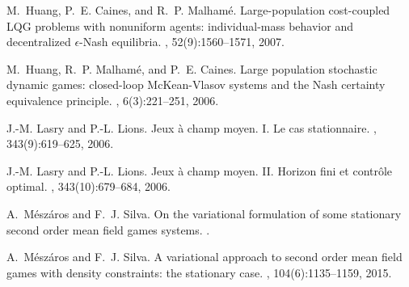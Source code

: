 \documentclass[12pt]{amsart}
\newcommand{\1}{{\chi}}
\theoremstyle{definition}
\begin{document}
\begin{thebibliography}{10}
	M.~Huang, P.~E. Caines, and R.~P. Malham{\'e}.
	\newblock Large-population cost-coupled {LQG} problems with nonuniform agents:
	individual-mass behavior and decentralized {$\epsilon$}-{N}ash equilibria.
	, 52(9):1560--1571, 2007.
	
	M.~Huang, R.~P. Malham{\'e}, and P.~E. Caines.
	\newblock Large population stochastic dynamic games: closed-loop
	{M}c{K}ean-{V}lasov systems and the {N}ash certainty equivalence principle.
	, 6(3):221--251, 2006.
	
	J.-M. Lasry and P.-L. Lions.
	\newblock Jeux \`a champ moyen. {I}. {L}e cas stationnaire.
	, 343(9):619--625, 2006.
	
	J.-M. Lasry and P.-L. Lions.
	\newblock Jeux \`a champ moyen. {II}. {H}orizon fini et contr\^ole optimal.
	, 343(10):679--684, 2006.
	
	A.~M\'esz\'aros and F.~J. Silva.
	\newblock On the variational formulation of some stationary second order mean
	field games systems.
	.
	
	A.~M\'esz\'aros and F.~J. Silva.
	\newblock A variational approach to second order mean field games with density
	constraints: the stationary case.
	, 104(6):1135--1159, 2015.
	
\end{thebibliography}
\end{document}
